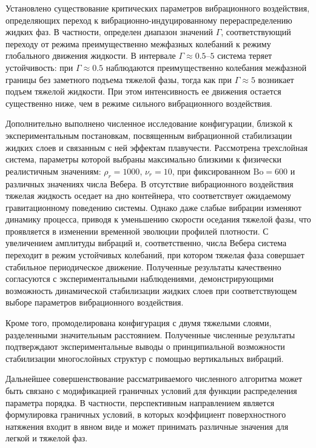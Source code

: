 \documentclass[12pt,a4paper]{article}
\begin{document}
Установлено существование критических параметров вибрационного воздействия, определяющих переход к вибрационно-индуцированному перераспределению жидких фаз. В частности, определен диапазон значений $\Gamma$, соответствующий переходу от режима преимущественно межфазных колебаний к режиму глобального движения жидкости. В интервале $\Gamma\approx0.5$--$5$ система теряет устойчивость: при $\Gamma\approx0.5$ наблюдаются преимущественно колебания межфазной границы без заметного подъема тяжелой фазы, тогда как при $\Gamma\approx5$ возникает подъем тяжелой жидкости. При этом интенсивность ее движения остается существенно ниже, чем в режиме сильного вибрационного воздействия.

Дополнительно выполнено численное исследование конфигурации, близкой к экспериментальным постановкам, посвященным вибрационной стабилизации жидких слоев и связанным с ней эффектам плавучести. Рассмотрена трехслойная система, параметры которой выбраны максимально близкими к физически реалистичным значениям: $\rho_r=1000$, $\nu_r=10$, при фиксированном $\mathrm{Bo}=600$ и различных значениях числа Вебера. В отсутствие вибрационного воздействия тяжелая жидкость оседает на дно контейнера, что соответствует ожидаемому гравитационному поведению системы. Однако даже слабые вибрации изменяют динамику процесса, приводя к уменьшению скорости оседания тяжелой фазы, что проявляется в изменении временной эволюции профилей плотности. С увеличением амплитуды вибраций и, соответственно, числа Вебера система переходит в режим устойчивых колебаний, при котором тяжелая фаза совершает стабильное периодическое движение. Полученные результаты качественно согласуются с экспериментальными наблюдениями, демонстрирующими возможность динамической стабилизации жидких слоев при соответствующем выборе параметров вибрационного воздействия.

Кроме того, промоделирована конфигурация с двумя тяжелыми слоями, разделенными значительным расстоянием. Полученные численные результаты подтверждают экспериментальные выводы о принципиальной возможности стабилизации многослойных структур с помощью вертикальных вибраций.

Дальнейшее совершенствование рассматриваемого численного алгоритма может быть связано с модификацией граничных условий для функции распределения параметра порядка. В частности, перспективным направлением является формулировка граничных условий, в которых коэффициент поверхностного натяжения входит в явном виде и может принимать различные значения для легкой и тяжелой фаз.
\end{document}
